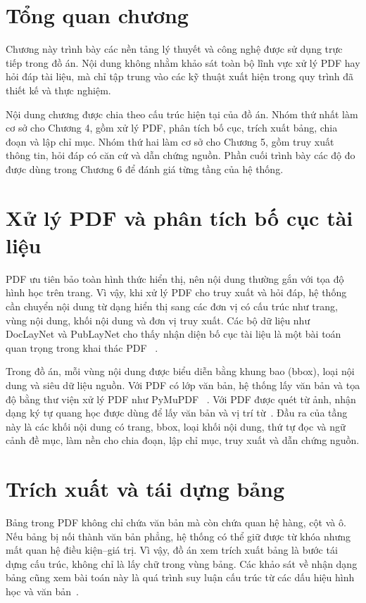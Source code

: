 \documentclass[../DoAn.tex]{subfiles}
\begin{document}
\section{Tổng quan chương}

Chương này trình bày các nền tảng lý thuyết và công nghệ được sử dụng trực tiếp
trong đồ án. Nội dung không nhằm khảo sát toàn bộ lĩnh vực xử lý PDF hay hỏi đáp
tài liệu, mà chỉ tập trung vào các kỹ thuật xuất hiện trong quy trình đã thiết kế và
thực nghiệm.

Nội dung chương được chia theo cấu trúc hiện tại của đồ án. Nhóm thứ nhất làm
cơ sở cho Chương 4, gồm xử lý PDF, phân tích bố cục, trích xuất bảng, chia đoạn
và lập chỉ mục. Nhóm thứ hai làm cơ sở cho Chương 5, gồm truy xuất thông tin,
hỏi đáp có căn cứ và dẫn chứng nguồn. Phần cuối trình bày các độ đo được dùng
trong Chương 6 để đánh giá từng tầng của hệ thống.

\section{Xử lý PDF và phân tích bố cục tài liệu}
\label{section:pdf-layout-foundation}

PDF ưu tiên bảo toàn hình thức hiển thị, nên nội dung thường gắn với tọa độ hình
học trên trang. Vì vậy, khi xử lý PDF cho truy xuất và hỏi đáp, hệ thống cần chuyển
nội dung từ dạng hiển thị sang các đơn vị có cấu trúc như trang, vùng nội dung,
khối nội dung và đơn vị truy xuất. Các bộ dữ liệu như DocLayNet và PubLayNet cho thấy nhận diện
bố cục tài liệu là một bài toán quan trọng trong khai thác PDF~
\cite{pfitzmann2022doclaynet,zhong2019publaynet,shen2021layoutparser}.

Trong đồ án, mỗi vùng nội dung được biểu diễn bằng khung bao (bbox), loại nội dung
và siêu dữ liệu nguồn. Với PDF có lớp văn bản,
hệ thống lấy văn bản và tọa độ bằng thư viện xử lý PDF như PyMuPDF~
\cite{pymupdf2026}. Với PDF được quét từ ảnh, nhận dạng ký tự quang học được
dùng để lấy văn bản và vị trí từ~\cite{du2020ppocr}. Đầu ra của tầng này là các
khối nội dung có trang, bbox, loại khối nội dung, thứ tự đọc và ngữ cảnh đề mục, làm nền cho
chia đoạn, lập chỉ mục, truy xuất và dẫn chứng nguồn.

\section{Trích xuất và tái dựng bảng}
\label{section:table-extraction-foundation}

Bảng trong PDF không chỉ chứa văn bản mà còn chứa quan hệ hàng, cột và ô. Nếu
bảng bị nối thành văn bản phẳng, hệ thống có thể giữ được từ khóa nhưng mất
quan hệ điều kiện--giá trị. Vì vậy, đồ án xem trích xuất bảng là bước tái dựng cấu
trúc, không chỉ là lấy chữ trong vùng bảng. Các khảo sát về nhận dạng bảng cũng xem bài toán này là quá trình suy luận cấu
trúc từ các dấu hiệu hình học và văn bản~\cite{zanibbi2004survey}.
\end{document}
